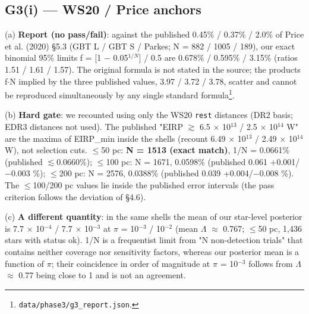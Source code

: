 \documentclass{aa}
\begin{document}
\subsection{G3(i) --- WS20 / Price anchors}
\noindent (a) \textbf{Report (no pass/fail)}: against the published 0.45\% / 0.37\% / 2.0\% of Price et al. (2020) \S{}5.3 (GBT L / GBT S / Parkes; N = 882 / 1005 / 189), our exact binomial 95\% limits f = [1 \(-\) 0.05\(^{1/N}\)] / 0.5 are 0.678\% / 0.595\% / 3.15\% (ratios 1.51 / 1.61 / 1.57). The original formula is not stated in the source; the products f\(\cdot\)N implied by the three published values, 3.97 / 3.72 / 3.78, scatter and cannot be reproduced simultaneously by any single standard formula\footnote{\texttt{data/phase3/g3\_report.json}.}.\par\smallskip
\noindent (b) \textbf{Hard gate}: we recounted using only the WS20 \texttt{rest} distances (DR2 basis; EDR3 distances not used). The published "EIRP \(\gtrsim\) 6.5 \(\times\) 10\(^{13}\) / 2.5 \(\times\) 10\(^{14}\) W" are the maxima of EIRP\_min inside the shells (recount 6.49 \(\times\) 10\(^{13}\) / 2.49 \(\times\) 10\(^{14}\) W), not selection cuts. \(\leq\)50 pc: \textbf{N = 1513 (exact match)}, 1/N = 0.0661\% (published \(\lesssim\)0.0660\%); \(\leq\)100 pc: N = 1671, 0.0598\% (published 0.061 +0.001/\(-\)0.003 \%); \(\leq\)200 pc: N = 2576, 0.0388\% (published 0.039 +0.004/\(-\)0.008 \%). The \(\leq\)100/200 pc values lie inside the published error intervals (the pass criterion follows the deviation of \S{}4.6).\par\smallskip
\noindent (c) \textbf{A different quantity}: in the same shells the mean of our star-level posterior is 7.7 \(\times\) 10\(^{-4}\) / 7.7 \(\times\) 10\(^{-3}\) at \(\pi\) = 10\(^{-3}\) / 10\(^{-2}\) (mean \(\Lambda\) \(\approx\) 0.767; \(\leq\)50 pc, 1,436 stars with status ok). 1/N is a frequentist limit from "N non-detection trials" that contains neither coverage nor sensitivity factors, whereas our posterior mean is a function of \(\pi\); their coincidence in order of magnitude at \(\pi\) = 10\(^{-3}\) follows from \(\Lambda\) \(\approx\) 0.77 being close to 1 and is not an agreement.\par\smallskip
\end{document}
